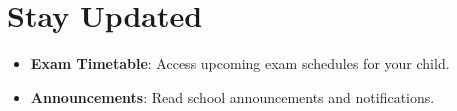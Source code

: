 \documentclass[12pt, a4paper]{report}
\begin{document}
\section{Stay Updated}
\begin{itemize}
    \item \textbf{Exam Timetable}: Access upcoming exam schedules for your child.
    \item \textbf{Announcements}: Read school announcements and notifications.
\end{itemize}
\end{document}
